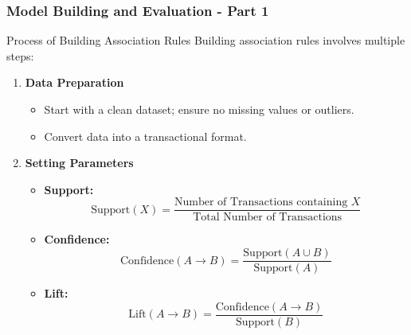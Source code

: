 \documentclass{beamer}
\begin{document}
\begin{frame}[fragile]
    \frametitle{Model Building and Evaluation - Part 1}

    \begin{block}{Process of Building Association Rules}
        Building association rules involves multiple steps:
    \end{block}

    \begin{enumerate}
        \item \textbf{Data Preparation}
        \begin{itemize}
            \item Start with a clean dataset; ensure no missing values or outliers.
            \item Convert data into a transactional format.
        \end{itemize}

        \item \textbf{Setting Parameters}
        \begin{itemize}
            \item \textbf{Support:} 
            \begin{equation}
                \text{Support}(X) = \frac{\text{Number of Transactions containing } X}{\text{Total Number of Transactions}}
            \end{equation}
            \item \textbf{Confidence:}
            \begin{equation}
                \text{Confidence}(A \rightarrow B) = \frac{\text{Support}(A \cup B)}{\text{Support}(A)}
            \end{equation}
            \item \textbf{Lift:}
            \begin{equation}
                \text{Lift}(A \rightarrow B) = \frac{\text{Confidence}(A \rightarrow B)}{\text{Support}(B)}
            \end{equation}
        \end{itemize}
    \end{enumerate}
\end{frame}
\end{document}
